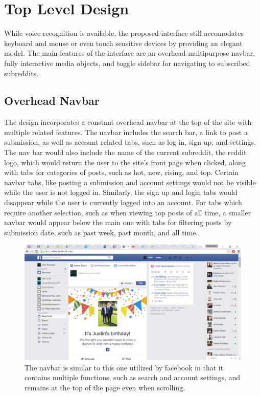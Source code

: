 \documentclass{article}
\begin{document}
\section{Top Level Design} While voice recognition is available, the proposed interface still accomodates keyboard and mouse or even touch sensitive devices by providing an elegant model. The main features of the interface are an overhead multipurpose navbar, fully interactive media objects, and toggle sidebar for navigating to subscribed subreddits.

\subsection{Overhead Navbar} The design incorporates a constant overhead navbar at the top of the site with multiple related features. The navbar includes the search bar, a link to post a submission, as well as account related tabs, such as log in, sign up, and settings. The nav bar would also include the name of the current subreddit, the reddit logo, which would return the user to the site's front page when clicked, along with tabs for categories of posts, such as hot, new, rising, and top. Certain navbar tabs, like posting a submission and account settings would not be visible while the user is not logged in. Similarly, the sign up and login tabs would disappear while the user is currently logged into an account. For tabs which require another selection, such as when viewing top posts of all time, a smaller navbar would appear below the main one with tabs for filtering posts by submission date, such as past week, past month, and all time.

\begin{figure}[H]
\begin{center}
\includegraphics[width=1\textwidth]{navbar.png}
\caption{The navbar is similar to this one utilized by facebook in that it contains multiple functions, such as search and account settings, and remains at the top of the page even when scrolling.}
\end{center}
\end{figure}
\end{document}

